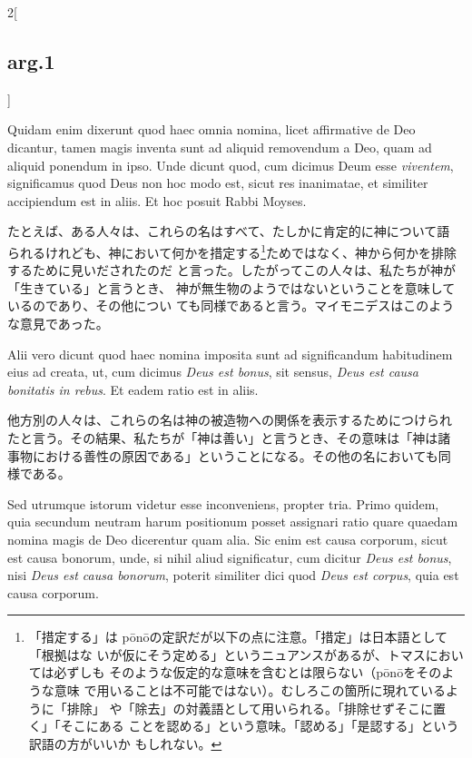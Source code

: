 \documentclass[paper=a4paper,fontsize=10pt,jafontsize=9pt,titlepage]{jlreq}
\begin{document}
\begin{paracol}{2}[\subsection{arg.1}]
\switchcolumn*

Quidam enim dixerunt quod haec omnia nomina, licet affirmative
de Deo dicantur, tamen magis inventa sunt ad aliquid removendum a Deo,
quam ad aliquid ponendum in ipso. Unde dicunt quod, cum dicimus Deum
esse {\itshape viventem}, significamus quod Deus non hoc modo est, sicut res
inanimatae, et similiter accipiendum est in aliis. Et hoc posuit Rabbi
Moyses.

\switchcolumn

たとえば、ある人々は、これらの名はすべて、たしかに肯定的に神について語
られるけれども、神において何かを措定する\footnote{「措定する」は
p\={o}n\={o}の定訳だが以下の点に注意。「措定」は日本語として「根拠はな
いが仮にそう定める」というニュアンスがあるが、トマスにおいては必ずしも
そのような仮定的な意味を含むとは限らない（p\={o}n\={o}をそのような意味
で用いることは不可能ではない）。むしろこの箇所に現れているように「排除」
や「除去」の対義語として用いられる。「排除せずそこに置く」「そこにある
ことを認める」という意味。「認める」「是認する」という訳語の方がいいか
もしれない。}ためではなく、神から何かを排除するために見いだされたのだ
と言った。したがってこの人々は、私たちが神が「生きている」と言うとき、
神が無生物のようではないということを意味しているのであり、その他につい
ても同様であると言う。マイモニデスはこのような意見であった。

\switchcolumn*

Alii vero dicunt quod haec nomina imposita sunt ad significandum
habitudinem eius ad creata, ut, cum dicimus {\itshape Deus est bonus}, sit
sensus, {\itshape Deus est causa bonitatis in rebus}. Et eadem ratio est in
aliis.

\switchcolumn

他方別の人々は、これらの名は神の被造物への関係を表示するためにつけられ
たと言う。その結果、私たちが「神は善い」と言うとき、その意味は「神は諸
事物における善性の原因である」ということになる。その他の名においても同
様である。

\switchcolumn*

Sed utrumque istorum videtur esse inconveniens, propter tria. Primo
quidem, quia secundum neutram harum positionum posset assignari ratio
quare quaedam nomina magis de Deo dicerentur quam alia. Sic enim est
causa corporum, sicut est causa bonorum, unde, si nihil aliud
significatur, cum dicitur {\itshape Deus est bonus}, nisi {\itshape Deus est
causa bonorum}, poterit similiter dici quod {\itshape Deus est corpus},
quia est causa corporum.

\switchcolumn


\end{paracol}
\end{document}

